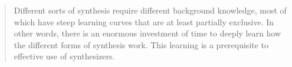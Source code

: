 \begin{quote}
    Different sorts of synthesis require different background knowledge, most of which have steep learning curves that are at least partially exclusive. In other words, there is an enormous investment of time to deeply learn how the different forms of synthesis work. This learning is a prerequisite to effective use of synthesizers.
\end{quote}









